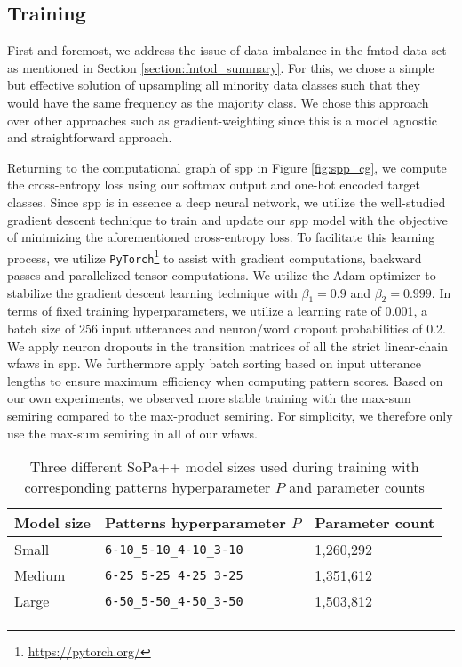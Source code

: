 \subsection{Training}

\label{section:spp_training}

First and foremost, we address the issue of data imbalance in the \ac{fmtod}
data set as mentioned in Section \ref{section:fmtod_summary}. For this, we chose
a simple but effective solution of upsampling all minority data classes such
that they would have the same frequency as the majority class. We chose this
approach over other approaches such as gradient-weighting since this is a model
agnostic and straightforward approach.

Returning to the computational graph of \ac{spp} in Figure \ref{fig:spp_cg}, we
compute the cross-entropy loss using our softmax output and one-hot
encoded target classes. Since \ac{spp} is in essence a deep neural network, we utilize
the well-studied gradient descent technique to train and update our \ac{spp} model
with the objective of minimizing the aforementioned cross-entropy loss. To
facilitate this learning process, we utilize
\texttt{PyTorch}\footnote{\url{https://pytorch.org/}} to assist with gradient computations,
backward passes and parallelized tensor computations. We utilize the Adam
optimizer \citep{DBLP:journals/corr/KingmaB14} to stabilize the gradient descent
learning technique with $\beta_1=0.9$ and $\beta_2=0.999$. In terms of fixed
training hyperparameters, we utilize a learning rate of 0.001, a batch size of
256 input utterances and neuron/word dropout probabilities of 0.2. We apply
neuron dropouts in the transition matrices of all the strict linear-chain
\ac{wfaws} in \ac{spp}. We furthermore apply batch sorting based on input
utterance lengths to ensure maximum efficiency when computing pattern
scores. Based on our own experiments, we observed more stable training with the
max-sum semiring compared to the max-product semiring. For simplicity, we
therefore only use the max-sum semiring in all of our \ac{wfaws}.

\begin{table}[t!]
  \centering
  \begin{tabular}{lll}
    \toprule
    Model size & Patterns hyperparameter $P$ & Parameter count \\
    \midrule
    Small & \texttt{6-10\_5-10\_4-10\_3-10} & 1,260,292 \\
    Medium & \texttt{6-25\_5-25\_4-25\_3-25} & 1,351,612  \\
    Large & \texttt{6-50\_5-50\_4-50\_3-50} & 1,503,812 \\
    \bottomrule
  \end{tabular}
  \caption{Three different SoPa++ model sizes used during training with
    corresponding patterns hyperparameter $P$ and parameter counts}
  \label{tab:model_types}
\end{table}

